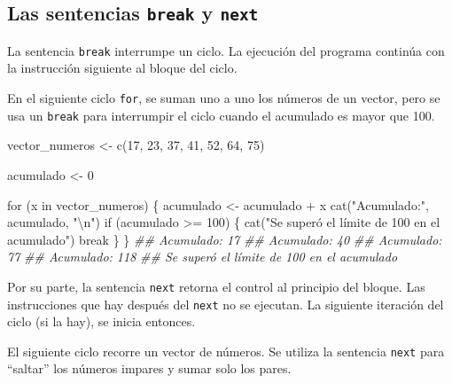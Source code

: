 \documentclass[
  letterpaper,
  DIV=11,
  numbers=noendperiod]{scrreprt}
\newenvironment{Shaded}{\begin{snugshade}}{\end{snugshade}}
\newcommand{\ControlFlowTok}[1]{\textcolor[rgb]{0.00,0.23,0.31}{#1}}
\newcommand{\DecValTok}[1]{\textcolor[rgb]{0.68,0.00,0.00}{#1}}
\newcommand{\DocumentationTok}[1]{\textcolor[rgb]{0.37,0.37,0.37}{\textit{#1}}}
\newcommand{\FunctionTok}[1]{\textcolor[rgb]{0.28,0.35,0.67}{#1}}
\newcommand{\NormalTok}[1]{\textcolor[rgb]{0.00,0.23,0.31}{#1}}
\newcommand{\OtherTok}[1]{\textcolor[rgb]{0.00,0.23,0.31}{#1}}
\newcommand{\SpecialCharTok}[1]{\textcolor[rgb]{0.37,0.37,0.37}{#1}}
\newcommand{\StringTok}[1]{\textcolor[rgb]{0.13,0.47,0.30}{#1}}
\begin{document}
\hypertarget{las-sentencias-break-y-next}{%
\subsection{\texorpdfstring{Las sentencias \texttt{break} y
\texttt{next}}{Las sentencias break y next}}\label{las-sentencias-break-y-next}}

La sentencia \texttt{break} interrumpe un ciclo. La ejecución del
programa continúa con la instrucción siguiente al bloque del ciclo.

En el siguiente ciclo \texttt{for}, se suman uno a uno los números de un
vector, pero se usa un \texttt{break} para interrumpir el ciclo cuando
el acumulado es mayor que 100.

\begin{Shaded}
\begin{Highlighting}[]
\NormalTok{vector\_numeros }\OtherTok{\textless{}{-}} \FunctionTok{c}\NormalTok{(}\DecValTok{17}\NormalTok{, }\DecValTok{23}\NormalTok{, }\DecValTok{37}\NormalTok{, }\DecValTok{41}\NormalTok{, }\DecValTok{52}\NormalTok{, }\DecValTok{64}\NormalTok{, }\DecValTok{75}\NormalTok{)}

\NormalTok{acumulado }\OtherTok{\textless{}{-}} \DecValTok{0}

\ControlFlowTok{for}\NormalTok{ (x }\ControlFlowTok{in}\NormalTok{ vector\_numeros) \{}
\NormalTok{  acumulado }\OtherTok{\textless{}{-}}\NormalTok{ acumulado }\SpecialCharTok{+}\NormalTok{ x}
  \FunctionTok{cat}\NormalTok{(}\StringTok{"Acumulado:"}\NormalTok{, acumulado, }\StringTok{"}\SpecialCharTok{\textbackslash{}n}\StringTok{"}\NormalTok{)}
  \ControlFlowTok{if}\NormalTok{ (acumulado }\SpecialCharTok{\textgreater{}=} \DecValTok{100}\NormalTok{) \{}
    \FunctionTok{cat}\NormalTok{(}\StringTok{"Se superó el límite de 100 en el acumulado"}\NormalTok{)}
    \ControlFlowTok{break}
\NormalTok{  \}}
\NormalTok{\}}
\DocumentationTok{\#\# Acumulado: 17 }
\DocumentationTok{\#\# Acumulado: 40 }
\DocumentationTok{\#\# Acumulado: 77 }
\DocumentationTok{\#\# Acumulado: 118 }
\DocumentationTok{\#\# Se superó el límite de 100 en el acumulado}
\end{Highlighting}
\end{Shaded}

Por su parte, la sentencia \texttt{next} retorna el control al principio
del bloque. Las instrucciones que hay después del \texttt{next} no se
ejecutan. La siguiente iteración del ciclo (si la hay), se inicia
entonces.

El siguiente ciclo recorre un vector de números. Se utiliza la sentencia
\texttt{next} para ``saltar'' los números impares y sumar solo los
pares.
\end{document}
